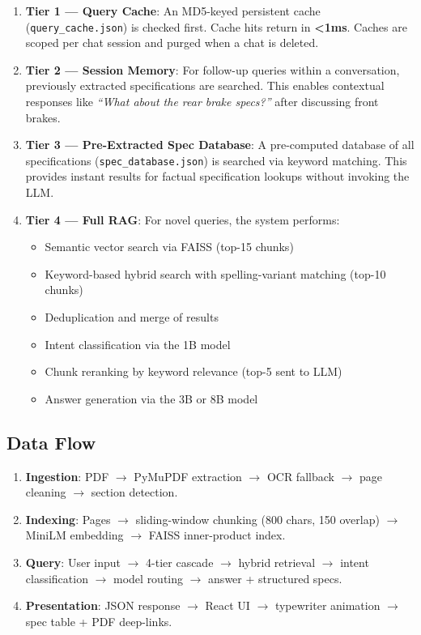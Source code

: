 \documentclass[12pt, a4paper]{article}
\begin{document}
\begin{enumerate}[itemsep=4pt]
  \item \textbf{Tier 1 — Query Cache}: An MD5-keyed persistent cache (\texttt{query\_cache.json}) is checked first. Cache hits return in \textbf{<1ms}. Caches are scoped per chat session and purged when a chat is deleted.
  
  \item \textbf{Tier 2 — Session Memory}: For follow-up queries within a conversation, previously extracted specifications are searched. This enables contextual responses like \textit{``What about the rear brake specs?''} after discussing front brakes.
  
  \item \textbf{Tier 3 — Pre-Extracted Spec Database}: A pre-computed database of all specifications (\texttt{spec\_database.json}) is searched via keyword matching. This provides instant results for factual specification lookups without invoking the LLM.
  
  \item \textbf{Tier 4 — Full RAG}: For novel queries, the system performs:
  \begin{itemize}
    \item Semantic vector search via FAISS (top-15 chunks)
    \item Keyword-based hybrid search with spelling-variant matching (top-10 chunks)
    \item Deduplication and merge of results
    \item Intent classification via the 1B model
    \item Chunk reranking by keyword relevance (top-5 sent to LLM)
    \item Answer generation via the 3B or 8B model
  \end{itemize}
\end{enumerate}

\subsection{Data Flow}

\begin{enumerate}[itemsep=2pt]
  \item \textbf{Ingestion}: PDF $\rightarrow$ PyMuPDF extraction $\rightarrow$ OCR fallback $\rightarrow$ page cleaning $\rightarrow$ section detection.
  \item \textbf{Indexing}: Pages $\rightarrow$ sliding-window chunking (800 chars, 150 overlap) $\rightarrow$ MiniLM embedding $\rightarrow$ FAISS inner-product index.
  \item \textbf{Query}: User input $\rightarrow$ 4-tier cascade $\rightarrow$ hybrid retrieval $\rightarrow$ intent classification $\rightarrow$ model routing $\rightarrow$ answer + structured specs.
  \item \textbf{Presentation}: JSON response $\rightarrow$ React UI $\rightarrow$ typewriter animation $\rightarrow$ spec table + PDF deep-links.
\end{enumerate}
\end{document}
